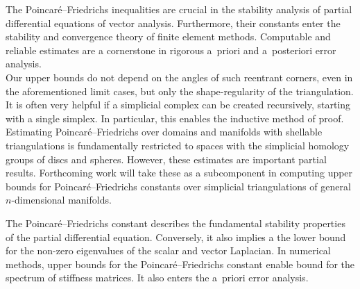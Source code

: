 \documentclass[a4paper]{amsart}
\begin{document}


\color{blue}

The Poincar\'e--Friedrichs inequalities are crucial in the stability analysis of partial differential equations of vector analysis. Furthermore, their constants enter the stability and convergence theory of finite element methods. Computable and reliable estimates are a cornerstone in rigorous a~priori and a~posteriori error analysis. 
\\

\color{red}Our upper bounds do not depend on the angles of such reentrant corners, even in the aforementioned limit cases, but only the shape-regularity of the triangulation. \color{black}
\\

It is often very helpful if a simplicial complex can be created recursively, starting with a single simplex. 
In particular, this enables the inductive method of proof.
\\

Estimating Poincar\'e--Friedrichs over domains and manifolds with shellable triangulations is fundamentally restricted to spaces with the simplicial homology groups of discs and spheres. However, these estimates are important partial results. Forthcoming work will take these as a subcomponent in computing upper bounds for Poincar\'e--Friedrichs constants over simplicial triangulations of general $n$-dimensional manifolds. 

\begin{remark}
    The Poincar\'e--Friedrichs constant describes the fundamental stability properties of the partial differential equation. 
    Conversely, it also implies a the lower bound for the non-zero eigenvalues of the scalar and vector Laplacian.
    In numerical methods, upper bounds for the Poincar\'e--Friedrichs constant enable bound for the spectrum of stiffness matrices. 
    It also enters the a~priori error analysis. 
\end{remark}
\end{document}
